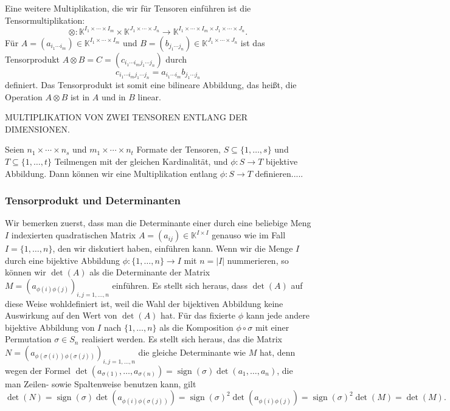 \documentclass[
a4paper,landscape,16pt,
bibliography=totocnumbered,
numbers=noenddot,
]{scrartcl}
\numberwithin{equation}{subsection}
\newcommand{\K}{\mathbb K}
\newcommand{\sign}{\operatorname{sign}} %
\theoremstyle{plain}
\theoremstyle{definition}
\begin{document}
Eine weitere Multiplikation, die wir für Tensoren einführen ist die Tensormultiplikation: 
\[
	 \otimes : \K^{I_1 \times \cdots \times I_m} \times \K^{J_1 \times \cdots \times  J_n} \to \K^{I_1 \times \cdots \times I_m \times J_1 \times \cdots \times J_n}. 
\]
Für $A = (a_{i_1\cdots i_m} ) \in \K^{I_1 \times \cdots \times I_m}$ und 
$B = (b_{j_1 \cdots j_n}) \in \K^{J_1 \times \cdots \times J_n}$ ist das Tensorprodukt $A \otimes B  =  C = (c_{i_1 \cdots i_m j_1 \cdots j_n})$ durch 
\[
	c_{i_1 \cdots i_m j_1 \cdots j_n} = a_{i_1 \cdots i_m} b_{j_1 \cdots j_n}
\]
definiert. Das Tensorprodukt ist somit eine bilineare Abbildung, das heißt, die Operation $A \otimes B$ ist in $A$ und in $B$ linear. 


MULTIPLIKATION VON ZWEI TENSOREN ENTLANG DER DIMENSIONEN. 

Seien $n_1 \times \cdots \times n_s$ und $m_1 \times \cdots \times n_t$ Formate der Tensoren, $S \subseteq \{1,\ldots, s\}$ und $T \subseteq \{1,\ldots, t\}$ Teilmengen mit der gleichen Kardinalität, und $\phi : S \to T$ bijektive Abbildung. Dann können wir eine Multiplikation entlang $\phi : S \to T$ definieren..... 

\subsubsection{Tensorprodukt und Determinanten} 

Wir bemerken zuerst, dass man die Determinante einer durch eine beliebige Meng $I$ indexierten quadratischen Matrix $A = (a_{ij}) \in \K^{I \times I}$ genauso wie im Fall $I = \{1,\ldots, n\}$, den wir diskutiert haben, einführen kann. Wenn wir die Menge $I$ durch eine bijektive Abbildung $ \phi :  \{1,\ldots,n\} \to I$ mit $n = |I|$ nummerieren, so können wir $\det(A)$ als die Determinante der Matrix $M = ( a_{\phi(i) \phi(j)} )_{i,j =1,\ldots, n}$ einführen. Es stellt sich heraus, dass $\det(A)$ auf diese Weise wohldefiniert ist, weil die Wahl der bijektiven Abbildung keine Auswirkung auf den Wert von $\det(A)$ hat. Für das fixierte $\phi$ kann jede andere bijektive Abbildung von $I$ nach $\{1,\ldots,n\}$ als die Komposition $\phi \circ \sigma$ mit einer Permutation $\sigma \in S_n$ realisiert werden. Es stellt sich heraus, das die Matrix $N = ( a_{\phi(\sigma(i)) \phi(\sigma(j))} )_{i,j=1,\ldots,n}$ die gleiche Determinante wie $M$ hat, denn wegen der Formel $\det(a_{\sigma(1)},\ldots,a_{\sigma(n)}) = \sign(\sigma) \det(a_1,\ldots,a_n)$, die man Zeilen- sowie Spaltenweise benutzen kann, gilt 
\[
	\det(N) = \sign(\sigma) \det ( a_{\phi(i) \phi(\sigma(j))} ) = \sign(\sigma)^2 
	\det( a_{\phi(i) \phi(j)} ) = \sign(\sigma)^2 \det(M) = \det(M). 
\] 
\end{document}
